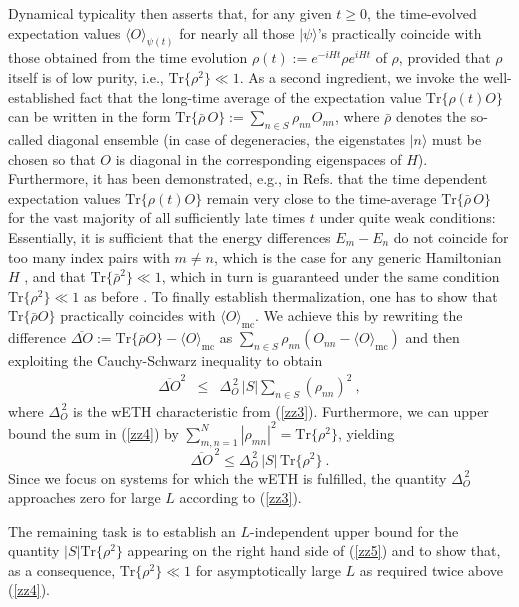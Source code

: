 \documentclass[twocolumn,aps,prb,floatfix,superscriptaddress]{revtex4-2}
\newcommand{\ket}[1]{\lvert #1 \rangle} 	%
\newcommand{\<}{\left\langle}	%
\renewcommand{\>}{\right\rangle}	%
\newcommand{\tr}{\mbox{Tr}}
\newcommand{\Omc}{\langle O\rangle_{\!\mathrm{mc}}}
\begin{document}
Dynamical typicality \cite{bar09, rei18a, rei20} then
asserts that, for any given $t\geq 0$,
the time-evolved expectation values $\langle O\rangle_{\!\psi(t)}$
for nearly all those $\ket\psi$'s practically coincide with those obtained from 
the time evolution $\rho(t) := e^{-i H t} \rho e^{i H t}$ 
of
$\rho$,
provided that $\rho$ itself is of low purity, i.e.,
$\tr\{\rho^2\} \ll 1$.
As a second ingredient, we 
invoke the well-established fact
\cite{ued20,dal16,gog16,mor18} that the
long-time average of the expectation value
$\tr\{\rho(t) O\}$ can be written
 in the form 
$\tr\{\bar{\rho}\,O\}:=\sum_{n\in S} \rho_{nn} O_{nn}$,
where $\bar\rho$
denotes the so-called
diagonal ensemble
(in case of degeneracies, the eigenstates $|n\rangle$ 
must be chosen so that $O$ is diagonal in the 
corresponding eigenspaces of $H$).
Furthermore, it has been demonstrated, e.g., in
Refs. \cite{equil} that the time dependent expectation values 
$\tr\{\rho(t) O\}$ remain very close to the time-average
$\tr\{\bar{\rho}\,O\}$ for the vast majority of all
sufficiently late times $t$ under quite weak conditions:
Essentially, it is sufficient that the energy differences 
$E_m-E_n$
do not coincide for too many index pairs with $m\not= n$,
which is the case for any generic Hamiltonian $H$
\cite{tas98,sre99,equil},
and that $\tr\{\bar\rho^2\} \ll 1$,
which in turn is guaranteed under 
the same condition $\tr\{\rho^2\} \ll 1$ 
as before \cite{rei20}.
To finally establish thermalization, one has to show that
$\tr\{\bar\rho O\}$ 
practically coincides with
$\Omc$.
We achieve this by rewriting the difference 
$\overline{\Delta O} := \tr\{\bar\rho O\} - \Omc$
as $\sum_{n\in S} \rho_{nn} (O_{nn}-\Omc)$
and then exploiting the Cauchy-Schwarz 
inequality to obtain
\begin{eqnarray}
\overline{\Delta O}^2 & \leq & \Delta_O^{\,2}\,   |S| \sum_{n\in S} (\rho_{nn})^2
\ ,
\label{zz4}
\end{eqnarray}
where $\Delta_O^{\,2}$ is
the wETH characteristic from (\ref{zz3}).
Furthermore, we can upper bound the sum in (\ref{zz4}) by 
$\sum_{m,n=1}^N |\rho_{mn}|^2
=\tr\{\rho^2\}$, yielding
\begin{equation}
\label{zz5}
	\overline{\Delta O}^{\,2} \leq \Delta_O^{\,2}  \, \lvert S \rvert  \, \tr\{\rho^2\} \ .
\end{equation}
Since we focus on systems for which the wETH is fulfilled, 
the quantity $\Delta_O^{\,2}$ approaches zero for large $L$ 
according to (\ref{zz3}).

The remaining task is to establish an $L$-independent upper bound for the quantity $|S|\tr\{\rho^2\}$ appearing 
on the right hand side of (\ref{zz5}) and to show that, 
as a consequence, $\tr\{\rho^2\} \ll 1$
for asymptotically large $L$
as required twice above (\ref{zz4}).
\end{document}
